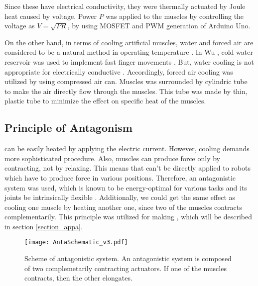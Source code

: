 Since these \scps have electrical conductivity, they were thermally actuated by Joule heat caused by voltage.
Power $ P $ was applied to the muscles by controlling the voltage as $ V=\sqrt{PR} $, by using MOSFET and PWM generation of Arduino Uno.

On the other hand, in terms of cooling artificial muscles, water and forced air are considered to be a natural method in operating temperature \cite{madden}.
In Wu \etal, cold water reservoir was used to implement fast finger movements \cite{finger}.
But, water cooling is not appropriate for electrically conductive \scpsnospace. Accordingly, forced air cooling was utilized by using compressed air can.
Muscles was surrounded by cylindric tube to make the air directly flow through the muscles.
This tube was made by thin, plastic tube to minimize the effect on specific heat of the muscles.


\subsection{Principle of Antagonism} \label{subsection_anta}
\scps can be easily heated by applying the electric current. However, cooling demands more sophisticated procedure. Also, muscles can produce force only by contracting, not by relaxing. This means that \scps can't be directly applied to robots which have to produce force in various positions.
Therefore, an antagonistic system was used, which is known to be energy-optimal for various tasks and its joints be intrinsically flexible \cite{antagonism}. 
Additionally, we could get the same effect as cooling one muscle by heating another one, since two of the muscles contracts complementarily.
This principle was utilized for making \antanospace, which will be described in section \ref{section_appa}.

\begin{figure}[b]
	\centering
	\texttt{[image: AntaSchematic\_v3.pdf]}
	\caption[Scheme of Antagonistic System.]{
		Scheme of antagonistic system.
		An antagonistic system is composed of two complemetarily contracting actuators.
		If one of the muscles contracts, then the other elongates.
	}
	\label{antagonism}
\end{figure}


